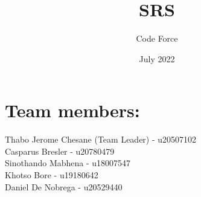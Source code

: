 \documentclass{article}
\title{SRS}
\author{Code Force}
\date{July 2022}
\begin{document}
\maketitle
\tableofcontents


\section{Team members:}
Thabo Jerome Chesane (Team Leader) - u20507102 \\
Casparus Bresler - u20780479 \\
Sinothando Mabhena - u18007547 \\ 
Khotso Bore - u19180642 \\ 
Daniel De Nobrega - u20529440 \\
\end{document}
